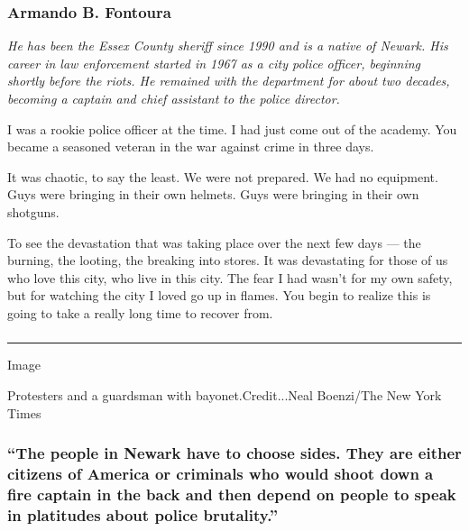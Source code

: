 \hypertarget{armando-b-fontoura}{%
\subsubsection{Armando B. Fontoura}\label{armando-b-fontoura}}

\emph{He has been the Essex County sheriff since 1990 and is a native of
Newark. His career in law enforcement started in 1967 as a city police
officer, beginning shortly before the riots. He remained with the
department for about two decades, becoming a captain and chief assistant
to the police director.}

I was a rookie police officer at the time. I had just come out of the
academy. You became a seasoned veteran in the war against crime in three
days.

It was chaotic, to say the least. We were not prepared. We had no
equipment. Guys were bringing in their own helmets. Guys were bringing
in their own shotguns.

To see the devastation that was taking place over the next few days ---
the burning, the looting, the breaking into stores. It was devastating
for those of us who love this city, who live in this city. The fear I
had wasn't for my own safety, but for watching the city I loved go up in
flames. You begin to realize this is going to take a really long time to
recover from.

\subsubsection{}

\begin{center}\rule{0.5\linewidth}{\linethickness}\end{center}

Image

Protesters and a guardsman with bayonet.Credit...Neal Boenzi/The New
York Times

\hypertarget{the-people-in-newark-have-to-choose-sides-they-are-either-citizens-of-america-or-criminals-who-would-shoot-down-a-fire-captain-in-the-back-and-then-depend-on-people-to-speak-in-platitudes-about-police-brutality}{%
\subsubsection{``The people in Newark have to choose sides. They are
either citizens of America or criminals who would shoot down a fire
captain in the back and then depend on people to speak in platitudes
about police
brutality.''}\label{the-people-in-newark-have-to-choose-sides-they-are-either-citizens-of-america-or-criminals-who-would-shoot-down-a-fire-captain-in-the-back-and-then-depend-on-people-to-speak-in-platitudes-about-police-brutality}}

